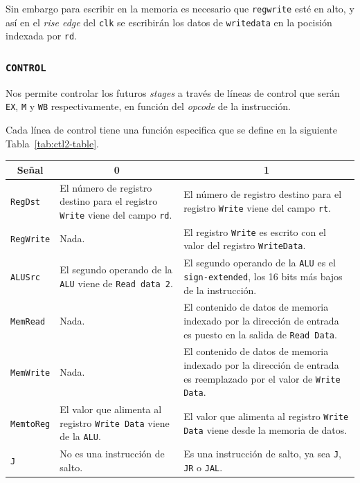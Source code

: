 \documentclass[a4paper]{article}
\begin{document}
Sin embargo para escribir en la memoria es necesario que \texttt{regwrite} esté en alto, y así en el \textit{rise edge} del \texttt{clk} se escribirán los datos de \texttt{writedata} en la pocisión indexada por \texttt{rd}.

\subsubsection{\texttt{CONTROL}}
Nos permite controlar los futuros \textit{stages} a través de líneas de control que serán \texttt{EX}, \texttt{M} y \texttt{WB} respectivamente, en función del \textit{opcode} de la instrucción.

Cada línea de control tiene una función especifica que se define en la siguiente Tabla~\ref{tab:ctl2-table}.

\begin{table}[H]
\centering
\begin{tabular}{|p{1.6cm}|p{4.3cm}|p{4.3cm}|}
\hline
\multicolumn{1}{|c|}{\textbf{\textbf{Señal}}} &
  \multicolumn{1}{c|}{\textbf{\textbf{0}}} &
  \multicolumn{1}{c|}{\textbf{\textbf{1}}} \\ \hline
\texttt{RegDst} &
  El número de registro destino para el registro \texttt{Write} viene del campo \texttt{rd}. &
  El número de registro destino para el registro \texttt{Write} viene del campo \texttt{rt}. \\ \hline
\texttt{RegWrite} &
  Nada. &
  El registro \texttt{Write} es escrito con el valor del registro \texttt{WriteData}. \\ \hline
\texttt{ALUSrc} &
  El segundo operando de la \texttt{ALU} viene de \texttt{Read data 2}. &
  El segundo operando de la \texttt{ALU} es el \texttt{sign-extended}, los 16 bits más bajos de la instrucción. \\ \hline
\texttt{MemRead} &
  Nada. &
  El contenido de datos de memoria indexado por la dirección de entrada es puesto en la salida de \texttt{Read Data}. \\ \hline
\texttt{MemWrite} &
  Nada. &
  El contenido de datos de memoria indexado por la dirección de entrada es reemplazado por el valor de \texttt{Write Data}. \\ \hline
\texttt{MemtoReg} &
  El valor que alimenta al registro \texttt{Write Data} viene de la \texttt{ALU}. &
  El valor que alimenta al registro \texttt{Write Data} viene desde la memoria de datos. \\ \hline
\texttt{J} &
  No es una instrucción de salto. & Es una instrucción de salto, ya sea \texttt{J}, \texttt{JR} o \texttt{JAL}. \\ \hline

\end{tabular}
\end{table}
\end{document}
